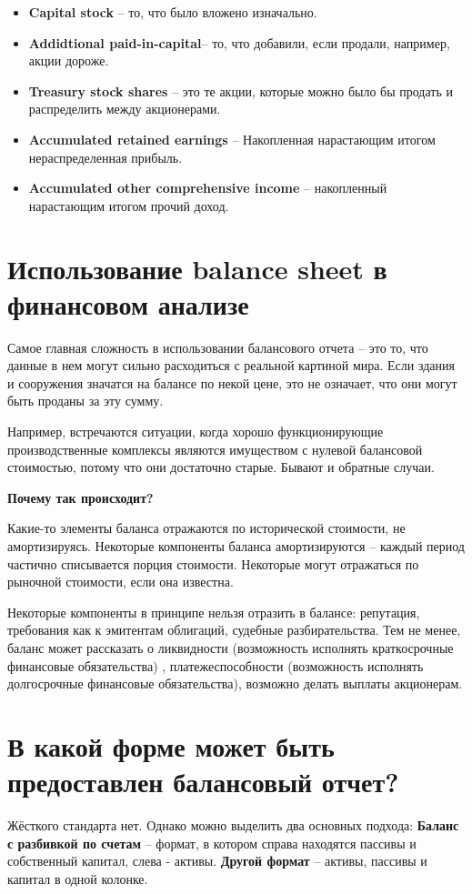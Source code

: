 \documentclass{article}
\begin{document}
\begin{itemize}
\item \textbf{Capital stock} – то, что было вложено изначально.
\item  \textbf{Addidtional paid-in-capital}–  то, что добавили, если продали, например, акции дороже.
\item \textbf{Treasury stock shares }– это те акции, которые можно было бы продать и распределить между акционерами.
\item \textbf{Accumulated retained earnings} –   Накопленная нарастающим итогом нераспределенная прибыль.
\item  \textbf{Accumulated other comprehensive income} – накопленный нарастающим итогом прочий доход.
\end{itemize}
                        
			 \section{ Использование balance sheet в финансовом анализе}

Самое главная сложность в использовании балансового отчета – это то, что данные в нем могут сильно расходиться с реальной картиной мира. Если здания и сооружения значатся на балансе по некой цене, это не означает, что они могут быть проданы за эту сумму.

Например, встречаются ситуации, когда хорошо функционирующие производственные комплексы являются имуществом с нулевой балансовой стоимостью, потому что они достаточно старые. Бывают и обратные случаи. 

\textbf{Почему так происходит?}

Какие-то элементы баланса отражаются по исторической стоимости, не амортизируясь. Некоторые компоненты баланса амортизируются – каждый период частично списывается порция стоимости. Некоторые могут отражаться по рыночной стоимости, если она известна. 

Некоторые компоненты в принципе нельзя отразить в балансе: репутация, требования как к эмитентам облигаций, судебные разбирательства.
Тем не менее, баланс может рассказать о ликвидности (возможность исполнять краткосрочные финансовые обязательства) , платежеспособности (возможность исполнять долгосрочные финансовые обязательства), возможно делать выплаты акционерам.

\section{В какой форме может быть предоставлен балансовый отчет?}
Жёсткого стандарта нет. Однако можно выделить два основных подхода:
\textbf{Баланс с разбивкой по счетам }– формат, в котором справа находятся пассивы и собственный капитал, слева - активы. 
\textbf{Другой формат} – активы, пассивы и капитал в одной колонке. 
\end{document}
